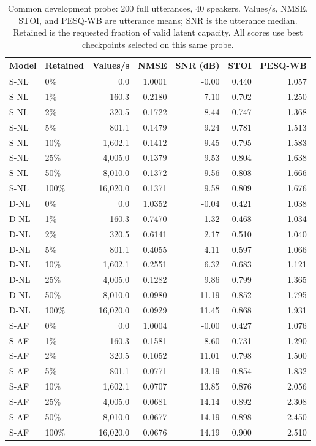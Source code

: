 \begin{table}[p]
\centering\small
\begin{tabular}{llrrrrr}
\toprule
Model & Retained & Values/s & NMSE & SNR (dB) & STOI & PESQ-WB \\
\midrule
S-NL & 0\% & 0.0 & 1.0001 & -0.00 & 0.440 & 1.057 \\
S-NL & 1\% & 160.3 & 0.2180 & 7.10 & 0.702 & 1.250 \\
S-NL & 2\% & 320.5 & 0.1722 & 8.44 & 0.747 & 1.368 \\
S-NL & 5\% & 801.1 & 0.1479 & 9.24 & 0.781 & 1.513 \\
S-NL & 10\% & 1,602.1 & 0.1412 & 9.45 & 0.795 & 1.583 \\
S-NL & 25\% & 4,005.0 & 0.1379 & 9.53 & 0.804 & 1.638 \\
S-NL & 50\% & 8,010.0 & 0.1372 & 9.56 & 0.808 & 1.666 \\
S-NL & 100\% & 16,020.0 & 0.1371 & 9.58 & 0.809 & 1.676 \\
\midrule
D-NL & 0\% & 0.0 & 1.0352 & -0.04 & 0.421 & 1.038 \\
D-NL & 1\% & 160.3 & 0.7470 & 1.32 & 0.468 & 1.034 \\
D-NL & 2\% & 320.5 & 0.6141 & 2.17 & 0.510 & 1.040 \\
D-NL & 5\% & 801.1 & 0.4055 & 4.11 & 0.597 & 1.066 \\
D-NL & 10\% & 1,602.1 & 0.2551 & 6.32 & 0.683 & 1.121 \\
D-NL & 25\% & 4,005.0 & 0.1282 & 9.86 & 0.799 & 1.365 \\
D-NL & 50\% & 8,010.0 & 0.0980 & 11.19 & 0.852 & 1.795 \\
D-NL & 100\% & 16,020.0 & 0.0929 & 11.45 & 0.868 & 1.931 \\
\midrule
S-AF & 0\% & 0.0 & 1.0004 & -0.00 & 0.427 & 1.076 \\
S-AF & 1\% & 160.3 & 0.1581 & 8.60 & 0.731 & 1.290 \\
S-AF & 2\% & 320.5 & 0.1052 & 11.01 & 0.798 & 1.500 \\
S-AF & 5\% & 801.1 & 0.0771 & 13.19 & 0.854 & 1.832 \\
S-AF & 10\% & 1,602.1 & 0.0707 & 13.85 & 0.876 & 2.056 \\
S-AF & 25\% & 4,005.0 & 0.0681 & 14.14 & 0.892 & 2.308 \\
S-AF & 50\% & 8,010.0 & 0.0677 & 14.19 & 0.898 & 2.450 \\
S-AF & 100\% & 16,020.0 & 0.0676 & 14.19 & 0.900 & 2.510 \\
\bottomrule
\end{tabular}
\caption{Common development probe: 200 full utterances, 40 speakers. Values/s, NMSE, STOI, and PESQ-WB are utterance means; SNR is the utterance median. Retained is the requested fraction of valid latent capacity. All scores use best checkpoints selected on this same probe.}
\label{tab:results}
\end{table}
